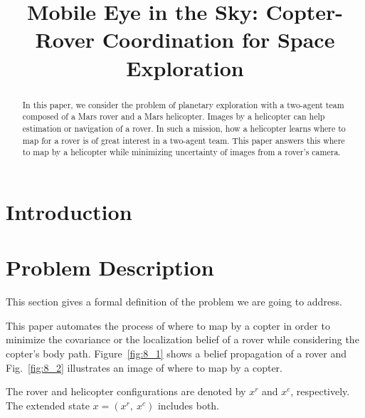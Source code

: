 \documentclass[conference]{IEEEtran}
\begin{document}
\title{\huge Mobile Eye in the Sky: Copter-Rover Coordination for Space Exploration}


\maketitle

\begin{abstract}
In this paper, we consider the problem of planetary exploration with a two-agent team composed of a Mars rover and a Mars helicopter. Images by a helicopter can help estimation or navigation of a rover. In such a mission, how a helicopter learns where to map for a rover is of great interest in a two-agent team. 
This paper answers this where to map by a helicopter while minimizing uncertainty of images from a rover’s camera.
\end{abstract}

\IEEEpeerreviewmaketitle

\section{Introduction}


\section{Problem Description}
This section gives a formal definition of the problem we are going to address. 

This paper automates the process of where to map by a copter in order to minimize the covariance or the localization belief of a rover while considering the copter’s body path. Figure~\ref{fig:8_1} shows a belief propagation of a rover and Fig.~\ref{fig:8_2} illustrates an image of where to map by a copter.

The rover and helicopter configurations are denoted by $x^r$ and $x^c$, respectively. The extended state $x=(x^r,~x^c)$ includes both.
\end{document}
